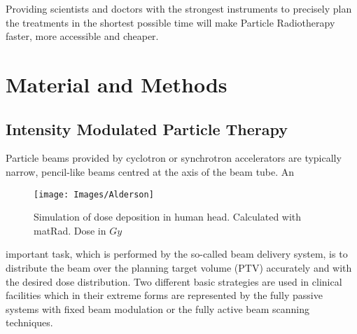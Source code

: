 \documentclass[12pt, a4paper, twoside]{book}
\begin{document}
Providing scientists and doctors with the strongest instruments to precisely plan the treatments in the shortest possible time will make Particle Radiotherapy faster, more accessible and cheaper.









\chapter{Material and Methods} \label{MatMeth}%

\section{Intensity Modulated Particle Therapy}

Particle beams provided by cyclotron or synchrotron accelerators are typically narrow, pencil-like beams centred at the axis of the beam tube. An 
\begin{wrapfigure}{l}{.5\textwidth}
{\texttt{[image: Images/Alderson]}}
\caption{Simulation of dose deposition in human head. Calculated with matRad. Dose in $Gy$}
\label{fig:alderson}
\vspace{-10mm}
\end{wrapfigure}
\noindent important task, which is performed by the so-called beam delivery system, is to distribute the beam over the planning target volume (PTV) accurately and with the desired dose distribution.
Two different basic strategies are used in clinical facilities which in their extreme forms are represented by the fully passive systems with fixed beam modulation or the fully active beam scanning techniques.
\end{document}
